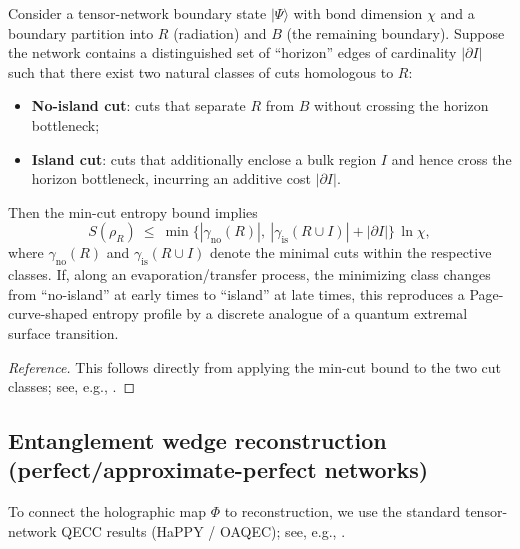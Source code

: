 \begin{proposition}
\label{prop:page_curve_mincut}
Consider a tensor-network boundary state $|\Psi\rangle$ with bond dimension $\chi$ and a boundary partition into $R$ (radiation) and $B$ (the remaining boundary). Suppose the network contains a distinguished set of ``horizon'' edges of cardinality $|\partial I|$ such that there exist two natural classes of cuts homologous to $R$:
\begin{itemize}
    \item \textbf{No-island cut}: cuts that separate $R$ from $B$ without crossing the horizon bottleneck;
    \item \textbf{Island cut}: cuts that additionally enclose a bulk region $I$ and hence cross the horizon bottleneck, incurring an additive cost $|\partial I|$.
\end{itemize}
Then the min-cut entropy bound implies
\begin{equation}
    S(\rho_R)\ \le\ \min\!\Big\{ |\gamma_{\mathrm{no}}(R)|,\ |\gamma_{\mathrm{is}}(R\cup I)|+|\partial I| \Big\}\,\ln\chi,
\end{equation}
where $\gamma_{\mathrm{no}}(R)$ and $\gamma_{\mathrm{is}}(R\cup I)$ denote the minimal cuts within the respective classes. If, along an evaporation/transfer process, the minimizing class changes from ``no-island'' at early times to ``island'' at late times, this reproduces a Page-curve-shaped entropy profile by a discrete analogue of a quantum extremal surface transition.
\end{proposition}
\begin{proof}[Reference]
This follows directly from applying the min-cut bound to the two cut classes; see, e.g., \cite{Harlow2017,Penington2020,Almheiri2019}.
\end{proof}

\subsection{Entanglement wedge reconstruction (perfect/approximate-perfect networks)}
To connect the holographic map $\Phi$ to reconstruction, we use the standard tensor-network QECC results (HaPPY / OAQEC); see, e.g., \cite{Pastawski2015,Harlow2017}.

